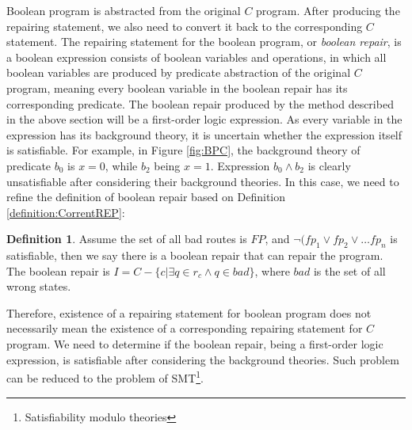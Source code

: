 \documentclass[10pt,journal,final,]{article}
\theoremstyle{definition}
\newtheorem{definition}{Definition}[section]
\begin{document}
Boolean program is abstracted from the original $C$ program. After producing the repairing statement, we also need to convert it back to the corresponding $C$ statement.
The repairing statement for the boolean program, or {\it boolean repair}, is a boolean expression consists of boolean variables and operations, in which all boolean variables are produced by predicate abstraction of the original $C$ program, meaning every boolean variable in the boolean repair has its corresponding predicate.
The boolean repair produced by the method described in the above section will be a first-order logic expression.
As every variable in the expression has its background theory, it is uncertain whether the expression itself is satisfiable.
For example, in Figure \ref{fig:BPC}, the background theory of predicate $b_{0}$ is $x = 0$, while $b_{2}$ being $x = 1$. Expression $b_{0} \wedge b_{2}$ is clearly unsatisfiable after considering their background theories.
In this case, we need to refine the definition of boolean repair based on Definition \ref{definition:CorrentREP}:

\begin{definition}
Assume the set of all bad routes is $FP$, and $\neg (fp_{1} \vee fp_{2} \vee\dots fp_{n}$ is satisfiable, then we say there is a boolean repair that can repair the program.
The boolean repair is $I = C - \{c | \exists q \in r_{c} \wedge q \in bad\}$, where $bad$ is the set of all wrong states.
\end{definition}

Therefore, existence of a repairing statement for boolean program does not necessarily mean the existence of a corresponding repairing statement for $C$ program.
We need to determine if the boolean repair, being a first-order logic expression, is satisfiable after considering the background theories. Such problem can be reduced to the problem of SMT\footnote{Satisfiability modulo theories}\cite{SMT}.
\end{document}

